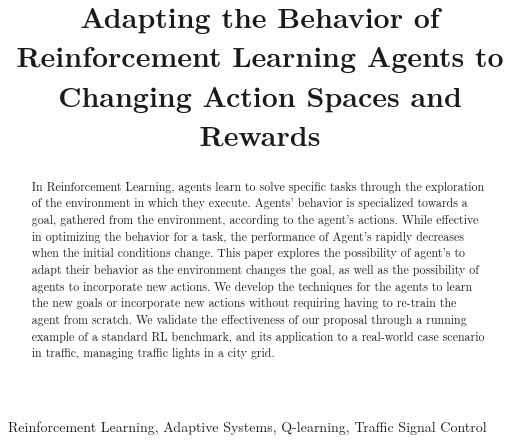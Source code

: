 \documentclass[10pt, conference, ]{IEEEtran}
\begin{document}
\title{Adapting the Behavior of Reinforcement Learning Agents to Changing Action Spaces and Rewards}

\author{
}

\maketitle


\begin{abstract}
In Reinforcement Learning, agents learn to solve specific tasks through the 
exploration of the environment in which they execute. Agents' behavior is
specialized towards a goal, gathered from the environment, according to the 
agent's actions. While effective in optimizing the behavior for a task, the 
performance of Agent's rapidly decreases when the initial conditions change.
This paper explores the possibility of agent's to adapt their behavior as 
the environment changes the goal, as well as the possibility of agents to
incorporate new actions. We develop the techniques for the agents to 
learn the new goals or incorporate new actions without requiring having to 
re-train the agent from scratch. We validate the effectiveness of our 
proposal through a running example of a standard RL benchmark, and its 
application to a real-world case scenario in traffic, managing traffic 
lights in a city grid. 
\end{abstract}

\begin{IEEEkeywords}
Reinforcement Learning,
Adaptive Systems,
Q-learning,
Traffic Signal Control
\end{IEEEkeywords}









\printbibliography
\end{document}
